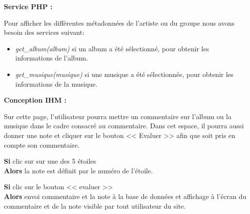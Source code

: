            \begin{paragraphe}
                \textbf{Service PHP :}
            \end{paragraphe}

            \begin{paragraphe}
                Pour afficher les différentes métadonnées de l'artiste ou du groupe nous avons besoin des services suivant:
                \begin{itemize}
                        \item \emph{get\_album(album)} si un album a été sélectionné, pour obtenir les informations de l'album.
                        \item \emph{get\_musique(musique)} si une musique a été sélectionnée, pour obtenir les informations de la musique.
                \end{itemize}
            \end{paragraphe}

            \begin{paragraphe}
                \textbf{Conception IHM :}
            \end{paragraphe}

			\begin{paragraphe}
				Sur cette page, l'utilisateur pourra mettre un commentaire sur l'album ou la musique dans le cadre consacré au commentaire.
				Dans cet espace, il pourra aussi donner une note et cliquer sur le bouton << Evaluer >> afin que soit pris en compte son commentaire.
			\end{paragraphe}

			\begin{paragraphe}
				\textbf{Si} clic sur sur une des 5 étoiles \\
				\textbf{Alors} la note est définit par le numéro de l'étoile.
			\end{paragraphe}

			\begin{paragraphe}
				\textbf{Si} clic sur le bouton << evaluer >> \\
				\textbf{Alors} envoi commentaire et la note à la base de données et affichage à l'écran du commentaire et de la note visible par tout utilisateur du site.
			\end{paragraphe}


        \clearpage


